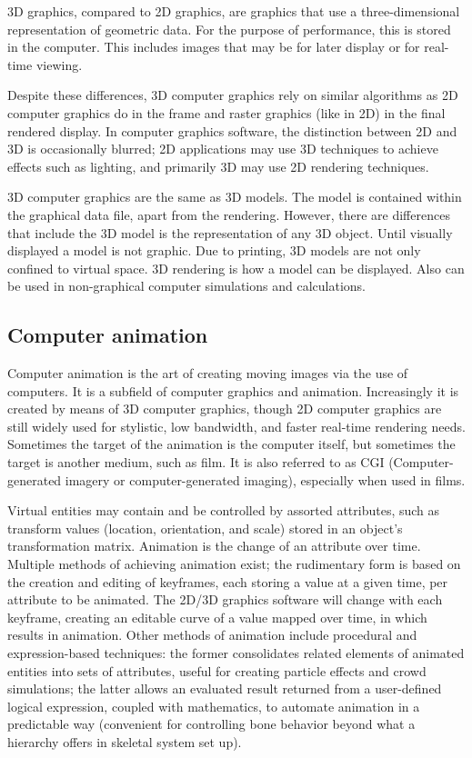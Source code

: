 \documentclass[a4paper]{article}
\begin{document}
 3D graphics, compared to 2D graphics, are graphics that use a three-dimensional representation of geometric data. For the purpose of performance, this is stored in the computer. This includes images that may be for later display or for real-time viewing.

Despite these differences, 3D computer graphics rely on similar algorithms as 2D computer graphics do in the frame and raster graphics (like in 2D) in the final rendered display. In computer graphics software, the distinction between 2D and 3D is occasionally blurred; 2D applications may use 3D techniques to achieve effects such as lighting, and primarily 3D may use 2D rendering techniques.

3D computer graphics are the same as 3D models. The model is contained within the graphical data file, apart from the rendering. However, there are differences that include the 3D model is the representation of any 3D object. Until visually displayed a model is not graphic. Due to printing, 3D models are not only confined to virtual space. 3D rendering is how a model can be displayed. Also can be used in non-graphical computer simulations and calculations.

\subsection{Computer animation}

Computer animation is the art of creating moving images via the use of computers. It is a subfield of computer graphics and animation. Increasingly it is created by means of 3D computer graphics, though 2D computer graphics are still widely used for stylistic, low bandwidth, and faster real-time rendering needs. Sometimes the target of the animation is the computer itself, but sometimes the target is another medium, such as film. It is also referred to as CGI (Computer-generated imagery or computer-generated imaging), especially when used in films.

Virtual entities may contain and be controlled by assorted attributes, such as transform values (location, orientation, and scale) stored in an object's transformation matrix. Animation is the change of an attribute over time. Multiple methods of achieving animation exist; the rudimentary form is based on the creation and editing of keyframes, each storing a value at a given time, per attribute to be animated. The 2D/3D graphics software will change with each keyframe, creating an editable curve of a value mapped over time, in which results in animation. Other methods of animation include procedural and expression-based techniques: the former consolidates related elements of animated entities into sets of attributes, useful for creating particle effects and crowd simulations; the latter allows an evaluated result returned from a user-defined logical expression, coupled with mathematics, to automate animation in a predictable way (convenient for controlling bone behavior beyond what a hierarchy offers in skeletal system set up).
\end{document}
